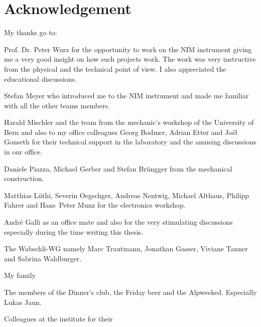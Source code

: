 \documentclass[a4paper, 12pt, abstracton]{scrartcl}
\begin{document}

	
	\newpage
	\thispagestyle{empty}
	\null
	\newpage
	
	\newpage
	
	\clearpage
	\newpage
	\thispagestyle{empty}
	\null
	\newpage
	
	\clearpage
	
	\newpage
	\thispagestyle{empty}
	\null
	\newpage
	
	\clearpage
	
	\clearpage
	
	\clearpage
	
	\section*{Acknowledgement}
	
	My thanks go to:
	
	Prof. Dr. Peter Wurz for the opportunity to work on the NIM instrument giving me a very good insight on how such projects work. The work was very instructive from the physical and the technical point of view. I also appreciated the educational discussions.
	
	Stefan Meyer who introduced me to the NIM instrument and made me familiar with all the other teams members.
		
	Harald Mischler and the team from the mechanic's workshop of the University of Bern and also to my office colleagues Georg Bodmer, Adrian Etter and Joël Gonseth for their technical support in the laboratory and the amusing discussions in our office.

	Daniele Piazza, Michael Gerber and Stefan Brüngger from the mechanical construction.
	
	Matthias Lüthi, Severin Oegschger, Andreas Nentwig, Michael Althaus, Philipp Fahrer and Hans~Peter Munz for the electronics workshop.
	
	André Galli as an office mate and also for the very stimulating discussions especially during the time writing this thesis.
	
	The Wabschli-WG namely Marc Trautmann, Jonathan Gasser, Viviane Tanner and Sabrina Waldburger.
	
	My family
	
	The members of the Dinner's club, the Friday beer and the Alpweeked. Especially Lukas Jaun.

	Colleagues at the institute for their
	
	\newpage
	\thispagestyle{empty}
	\null
	\newpage
	
	
	
\end{document}
